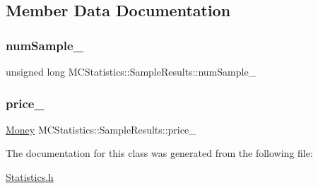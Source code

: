 \subsection{Member Data Documentation}
\hypertarget{class_m_c_statistics_1_1_sample_results_a068edc7e162d279df3df01df775f431a}{}\label{class_m_c_statistics_1_1_sample_results_a068edc7e162d279df3df01df775f431a} 
\subsubsection{\texorpdfstring{num\+Sample\+\_\+}{numSample\_}}
{\footnotesize\ttfamily unsigned long M\+C\+Statistics\+::\+Sample\+Results\+::num\+Sample\+\_\+}

\hypertarget{class_m_c_statistics_1_1_sample_results_a942ac0f979f34804055ff0f5287516f1}{}\label{class_m_c_statistics_1_1_sample_results_a942ac0f979f34804055ff0f5287516f1} 
\subsubsection{\texorpdfstring{price\+\_\+}{price\_}}
{\footnotesize\ttfamily \hyperlink{_name_def_8h_a5a9d48c16a694e9a2d9f1eca730dc8c5}{Money} M\+C\+Statistics\+::\+Sample\+Results\+::price\+\_\+}



The documentation for this class was generated from the following file\+:\begin{DoxyCompactItemize}
\item 
\hyperlink{_statistics_8h}{Statistics.\+h}\end{DoxyCompactItemize}
